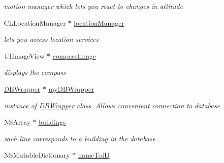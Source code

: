 \begin{DoxyCompactItemize}
\begin{DoxyCompactList}\small\item\em motion manager which lets you react to changes in attitude \end{DoxyCompactList}\item 
\hypertarget{interface_virt_tour_view_controller_aac1a6fa3c3f1c2968ef210bf663a26bf}{C\-L\-Location\-Manager $\ast$ \hyperlink{interface_virt_tour_view_controller_aac1a6fa3c3f1c2968ef210bf663a26bf}{location\-Manager}}\label{interface_virt_tour_view_controller_aac1a6fa3c3f1c2968ef210bf663a26bf}

\begin{DoxyCompactList}\small\item\em lets you access location services \end{DoxyCompactList}\item 
\hypertarget{interface_virt_tour_view_controller_ac06d2086dd76ce49661dc689f331eed4}{U\-I\-Image\-View $\ast$ \hyperlink{interface_virt_tour_view_controller_ac06d2086dd76ce49661dc689f331eed4}{compass\-Image}}\label{interface_virt_tour_view_controller_ac06d2086dd76ce49661dc689f331eed4}

\begin{DoxyCompactList}\small\item\em displays the compass \end{DoxyCompactList}\item 
\hypertarget{interface_virt_tour_view_controller_a97a22e88a8f4aa802a31a23824b528d8}{\hyperlink{interface_d_b_wrapper}{D\-B\-Wrapper} $\ast$ \hyperlink{interface_virt_tour_view_controller_a97a22e88a8f4aa802a31a23824b528d8}{my\-D\-B\-Wrapper}}\label{interface_virt_tour_view_controller_a97a22e88a8f4aa802a31a23824b528d8}

\begin{DoxyCompactList}\small\item\em instance of \hyperlink{interface_d_b_wrapper}{D\-B\-Wrapper} class. Allows convenient connection to database \end{DoxyCompactList}\item 
\hypertarget{interface_virt_tour_view_controller_aa53282dbe189663761e54e01a75121cc}{N\-S\-Array $\ast$ \hyperlink{interface_virt_tour_view_controller_aa53282dbe189663761e54e01a75121cc}{buildings}}\label{interface_virt_tour_view_controller_aa53282dbe189663761e54e01a75121cc}

\begin{DoxyCompactList}\small\item\em each line corresponds to a building in the database \end{DoxyCompactList}\item 
\hypertarget{interface_virt_tour_view_controller_a3b947ea6774d26876b8139dadcc71237}{N\-S\-Mutable\-Dictionary $\ast$ \hyperlink{interface_virt_tour_view_controller_a3b947ea6774d26876b8139dadcc71237}{name\-To\-I\-D}}\label{interface_virt_tour_view_controller_a3b947ea6774d26876b8139dadcc71237}


\end{DoxyCompactItemize}
